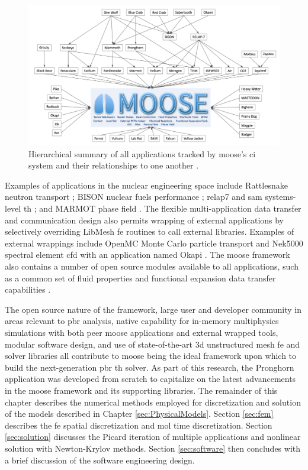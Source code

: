\begin{figure}[!h]
  \centering
  \includegraphics[width=0.9\linewidth]{figs/moose_apps.png}
  \caption{Hierarchical summary of all applications tracked by \gls{moose}'s \gls{ci} system and their relationships to one another \cite{moose_training}.}
\label{fig:moose_apps}
\end{figure}

Examples of applications in the nuclear engineering space include Rattlesnake neutron transport \cite{rattlesnake}; BISON nuclear fuels performance \cite{bison}; \gls{relap7} and \gls{sam} systems-level \gls{th} \cite{relap7,hu}; and MARMOT phase field \cite{tonks}. The flexible multi-application data transfer and communication design also permits wrapping of external applications by selectively overriding LibMesh \gls{fe} routines to call external libraries. Examples of external wrappings include OpenMC Monte Carlo particle transport and Nek5000 spectral element \gls{cfd} with an application named Okapi \cite{romano, NEK5000, novak}. The \gls{moose} framework also contains a number of open source modules available to all applications, such as a common set of fluid properties and functional expansion data transfer capabilities \cite{wendt}. 

The open source nature of the framework, large user and developer community in areas relevant to \gls{pbr} analysis, native capability for in-memory multiphysics simulations with both peer \gls{moose} applications and external wrapped tools, modular software design, and use of state-of-the-art \gls{3d} unstructured mesh \gls{fe} and solver libraries all contribute to \gls{moose} being the ideal framework upon which to build the next-generation \gls{pbr} \gls{th} solver. As part of this research, the Pronghorn application was developed from scratch to capitalize on the latest advancements in the \gls{moose} framework and its supporting libraries. The remainder of this chapter describes the numerical methods employed for discretization and solution of the models described in Chapter \ref{sec:PhysicalModels}. Section \ref{sec:fem} describes the \gls{fe} spatial discretization and \gls{mol} time discretization. Section \ref{sec:solution} discusses the Picard iteration of multiple applications and nonlinear solution with Newton-Krylov methods. Section \ref{sec:software} then concludes with a brief discussion of the software engineering design.

